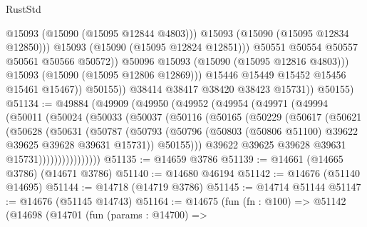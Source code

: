 \begin{lexlean}{RustStd}
\begin{coremodule}
                                @15093
                                (@15090 (@15095 @12844 @4803)))
                              @15093
                              (@15090 (@15095 @12834 @12850)))
                            @15093
                            (@15090 (@15095 @12824 @12851)))
                          @50551
                          @50554
                          @50557
                          @50561
                          @50566
                          @50572))
                      @50096
                      @15093
                      (@15090 (@15095 @12816 @4803)))
                    @15093
                    (@15090 (@15095 @12806 @12869)))
                  @15446
                  @15449
                  @15452
                  @15456
                  @15461
                  @15467))
              @50155))
          @38414
          @38417
          @38420
          @38423
          @15731))
      @50155)
@51134 := @49884
    (@49909
      (@49950
        (@49952
          (@49954
            (@49971
              (@49994
                (@50011
                  (@50024
                    (@50033
                      (@50037
                        (@50116
                          (@50165
                            (@50229
                              (@50617
                                (@50621
                                  (@50628
                                    (@50631
                                      (@50787
                                        (@50793
                                          (@50796
                                            (@50803
                                              (@50806 @51100)
                                              @39622
                                              @39625
                                              @39628
                                              @39631
                                              @15731))
                                          @50155)))
                                    @39622
                                    @39625
                                    @39628
                                    @39631
                                    @15731))))))))))))))))
@51135 := @14659 @3786
@51139 := @14661 (@14665 @3786) (@14671 @3786)
@51140 := @14680 @46194
@51142 := @14676 (@51140 @14695)
@51144 := @14718 (@14719 @3786)
@51145 := @14714 @51144
@51147 := @14676 (@51145 @14743)
@51164 := @14675
    (fun (fn : @100) =>
    @51142
      (@14698
        (@14701
          (fun (params : @14700) =>

\end{coremodule}
\end{lexlean}
